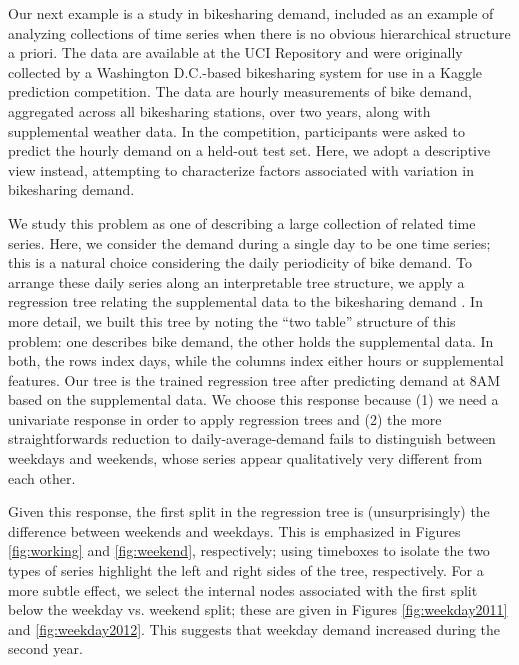 \documentclass{report}
\begin{document}
Our next example is a study in bikesharing demand, included as an example of
analyzing collections of time series when there is no obvious hierarchical
structure a priori. The data are available at the UCI Repository and were
originally collected by a Washington D.C.-based bikesharing system for use in a
Kaggle prediction competition. The data are hourly measurements of bike demand,
aggregated across all bikesharing stations, over two years, along with
supplemental weather data. In the competition, participants were asked to
predict the hourly demand on a held-out test set. Here, we adopt a descriptive
view instead, attempting to characterize factors associated with variation in
bikesharing demand.

We study this problem as one of describing a large collection of related time
series. Here, we consider the demand during a single day to be one time series;
this is a natural choice considering the daily periodicity of bike demand. To
arrange these daily series along an interpretable tree structure, we apply a
regression tree relating the supplemental data to the bikesharing demand
\citep{breiman1984classification}. In more detail, we built this tree by noting
the ``two table'' structure of this problem: one describes bike demand, the
other holds the supplemental data. In both, the rows index days, while the
columns index either hours or supplemental features. Our tree is the trained
regression tree after predicting demand at 8AM based on the supplemental data.
We choose this response because (1) we need a univariate response in order to
apply regression trees and (2) the more straightforwards reduction to
daily-average-demand fails to distinguish between weekdays and weekends, whose
series appear qualitatively very different from each other.

Given this response, the first split in the regression tree is (unsurprisingly)
the difference between weekends and weekdays. This is emphasized in Figures
\ref{fig:working} and \ref{fig:weekend}, respectively; using timeboxes to
isolate the two types of series highlight the left and right sides of the tree,
respectively. For a more subtle effect, we select the internal nodes associated
with the first split below the weekday vs. weekend split; these are given in
Figures \ref{fig:weekday2011} and \ref{fig:weekday2012}. This suggests that
weekday demand increased during the second year.
\end{document}
